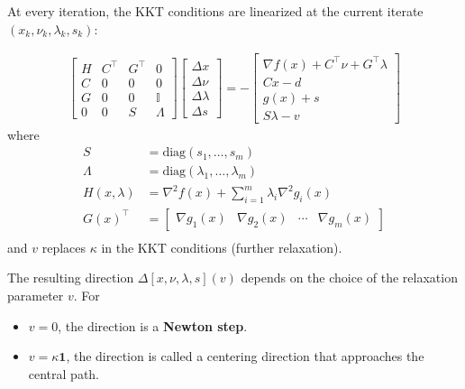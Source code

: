 \newpar{}
At every iteration, the KKT conditions are linearized at the current iterate $(x_k, \nu_k, \lambda_k, s_k)$:

\begin{align*}
    \begin{bmatrix}
        H & C^\top & {G}^\top & 0          \\
        C & 0      & 0        & 0          \\
        G & 0      & 0        & \mathbb{I} \\
        0 & 0      & S        & \Lambda
    \end{bmatrix}
    \begin{bmatrix}
        \Delta x      \\
        \Delta\nu     \\
        \Delta\lambda \\
        \Delta s
    \end{bmatrix}=-
    \begin{bmatrix}
        \nabla f(x)+C^\top\nu+{G}^\top\lambda \\
        Cx-d                                  \\
        g(x)+s                                \\
        S\lambda-v
    \end{bmatrix}
\end{align*}
where
\begin{align*}
    S            & = \mathrm{diag}(s_1, \ldots, s_m)                          \\
    \Lambda      & = \mathrm{diag}(\lambda_1, \ldots, \lambda_m)              \\
    H(x,\lambda) & = \nabla^2 f(x) + \sum_{i=1}^{m} \lambda_i \nabla^2 g_i(x) \\
    {G(x)}^\top  & = \begin{bmatrix}
                         \nabla g_1(x) & \nabla g_2(x) & \cdots & \nabla g_m(x)
                     \end{bmatrix}   \\
\end{align*}
and $v$ replaces $\kappa$ in the KKT conditions (further relaxation).

\newpar{}
The resulting direction $\Delta [x,\nu,\lambda,s](v)$ depends on the choice of the relaxation parameter $v$.
For
\begin{itemize}
    \item $v=0$, the direction is a \textbf{Newton step}.
    \item $v=\kappa \mathbf{1}$, the direction is called a centering direction that approaches the central path.
\end{itemize}

